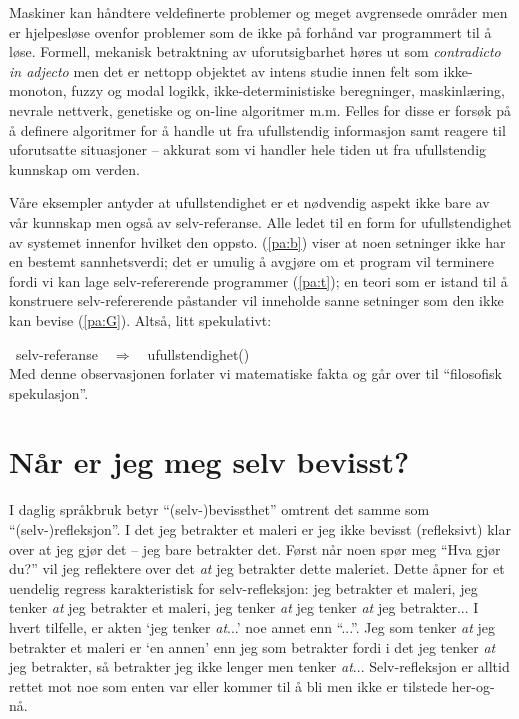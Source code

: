 \documentclass[10pt,twocolumn,leqno]{article}
\newcounter{EQ}
\newcommand{\equ}[1]{\refstepcounter{EQ}\vspace{.5ex}\par\noindent\ 
    \hfill #1\hfill{(\theEQ)}\\[.5ex]}
\newcommand{\refp}[1]{(\ref{#1})}
\newcommand{\<}{\langle}
\renewcommand{\>}{\rangle}
\begin{document}
Maskiner kan h{\aa}ndtere  veldefinerte problemer og 
meget avgrensede omr{\aa}der men er hjelpesl{\o}se 
 ovenfor problemer som de ikke p{\aa} forh{\aa}nd var 
programmert til {\aa} l{\o}se. Formell, mekanisk betraktning av uforutsigbarhet 
h{\o}res ut som {\em contradicto in adjecto} men det er nettopp objektet
av intens studie
innen felt som ikke-monoton, fuzzy og modal logikk,
ikke-deterministiske beregninger,
maskinl{\ae}ring, nevrale nettverk, genetiske og on-line algoritmer 
m.m. Felles for disse er fors{\o}k p{\aa} {\aa} definere algoritmer
for {\aa} handle ut fra ufullstendig informasjon samt reagere til 
uforutsatte situasjoner -- akkurat som vi handler hele tiden ut fra 
ufullstendig kunnskap om verden.

V{\aa}re eksempler antyder at ufullstendighet er 
et n{\o}dvendig aspekt ikke bare av v{\aa}r kunnskap men ogs{\aa} av selv-referanse.
Alle ledet til en form for ufullstendighet av 
systemet innenfor hvilket den oppsto. 
\refp{pa:b} 
viser at noen setninger ikke har en bestemt sannhetsverdi;
det er umulig {\aa} avgj{\o}re om et program vil 
terminere fordi vi kan lage selv-refererende 
programmer \refp{pa:t}; en teori som er istand til {\aa} konstruere 
selv-refererende p{\aa}stander vil inneholde sanne setninger som den 
ikke kan bevise \refp{pa:G}. Alts{\aa}, litt spekulativt:
\equ{selv-referanse\ \ $\Rightarrow$\ \ ufullstendighet}\label{eq:ufu}
Med denne observasjonen forlater vi matematiske fakta
 og g{\aa}r over til ``filosofisk spekulasjon''.

\section{N{\aa}r er jeg meg selv bevisst?}
I daglig spr{\aa}kbruk betyr ``(selv-)bevissthet'' omtrent det samme som 
``(selv-)refleksjon''. I det jeg betrakter et maleri er jeg ikke bevisst 
(refleksivt) klar over at jeg gj{\o}r det -- jeg bare betrakter det. 
F{\o}rst n{\aa}r noen sp{\o}r meg ``Hva gj{\o}r du?'' vil jeg reflektere over
det {\em at} jeg betrakter dette maleriet. 
Dette {\aa}pner for et uendelig regress karakteristisk for 
selv-refleksjon: jeg betrakter et maleri, jeg tenker {\em at} jeg betrakter et 
maleri, jeg tenker {\em at} jeg tenker {\em at} jeg betrakter... I hvert 
tilfelle, er akten `jeg tenker {\em at}...' noe annet enn 
``...''. Jeg som tenker {\em at} jeg betrakter et maleri er `en annen' enn jeg 
som betrakter fordi i det jeg tenker {\em at} jeg betrakter, 
s{\aa} betrakter jeg ikke lenger men tenker {\em at}... Selv-refleksjon er 
alltid rettet mot noe som enten var eller kommer til {\aa} bli men ikke er 
tilstede her-og-n{\aa}.
\end{document}
